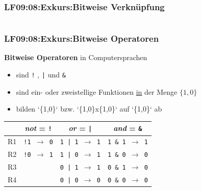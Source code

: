 
\begin{frame}[fragile]  
  \frametitle{LF09:08:Exkurs:Bitweise Verknüpfung}
  \begin{center}
    \begin{minipage}{0.9\textwidth}
      \inputminted[fontsize=\footnotesize,linenos]{python}{\snpLf/dm-0908-bitmask.py}
    \end{minipage}
  \end{center}
\end{frame}

\begin{frame}[fragile]  
  \frametitle{LF09:08:Exkurs:Bitweise Operatoren}
  \vspace{0.2cm}

  \begin{small}
  \textbf{Bitweise Operatoren} in Computersprachen
  \begin{itemize}
    \item sind \texttt{!} , \texttt{|} und \texttt{\&} 
    \item sind ein- oder zweistellige Funktionen \underline{in} der Menge $\{1,0\}$
    \item bilden `\{1,0\}` bzw. `\{1,0\}x\{1,0\}` auf `\{1,0\}` ab
  \end{itemize}
    
  \vspace{0.2cm}
  \begin{center}

      \renewcommand{\arraystretch}{1.3}
\begin{tabular}{c|c|c|c|}
  & \textit{not} = \texttt{!} & \textit{or} = \texttt{|} & \textit{and} = \texttt{\&} \\
  \hline
  R1 & \texttt{!1 $\rightarrow$ 0} & \texttt{1 | 1 $\rightarrow$ 1} & \texttt{1 \& 1 $\rightarrow$ 1} \\
  \hline
  R2 & \texttt{!0 $\rightarrow$ 1} & \texttt{1 | 0 $\rightarrow$ 1} & \texttt{1 \& 0 $\rightarrow$ 0} \\
  \hline
  R3 &  & \texttt{0 | 1 $\rightarrow$ 1} & \texttt{0 \& 1 $\rightarrow$ 0} \\
  \hline
  R4 &  & \texttt{0 | 0 $\rightarrow$ 0} & \texttt{0 \& 0 $\rightarrow$ 0} \\


\end{tabular}
\end{center}
\end{small}
\end{frame}
